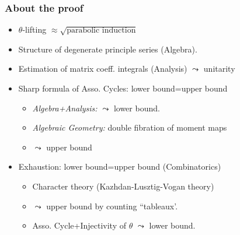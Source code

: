 \documentclass[t,serif,11pt,handout,usenames,dvipsnames]{beamer}
\theoremstyle{plain}
\theoremstyle{definition}
\def\blue{\color{blue}}
\let\oldemph\emph
\def\emph#1{\oldemph{\blue #1}}
\begin{document}
    \begin{frame}
      \frametitle{About the proof}
      \begin{itemize}[<+->]
        \item $\theta$-lifting $\approx \sqrt{\text{parabolic induction}}$
        \item  Structure of degenerate principle series ({Algebra}).
        \item Estimation of matrix coeff. integrals ({Analysis}) $\leadsto$ unitarity
        \item  {Sharp formula of Asso. Cycles}: {\color{orange} lower bound=upper bound}
              \begin{itemize}
                \item \emph{Algebra+Analysis: } $\leadsto$ lower bound.
                \item \emph{Algebraic Geometry:} double fibration of moment maps
                \item[] \hspace{2em} $\leadsto$ upper bound
              \end{itemize}
        \item {Exhaustion}: {\color{orange} lower bound=upper bound} (Combinatorics)
              \begin{itemize}
                \item Character theory (Kazhdan-Lusztig-Vogan theory)
                \item[] $\leadsto$ upper bound by counting ``tableaux'.
                \item {Asso. Cycle+Injectivity of $\theta$} $\leadsto$
                      lower bound.
              \end{itemize}
      \end{itemize}
    \end{frame}
\end{document}
